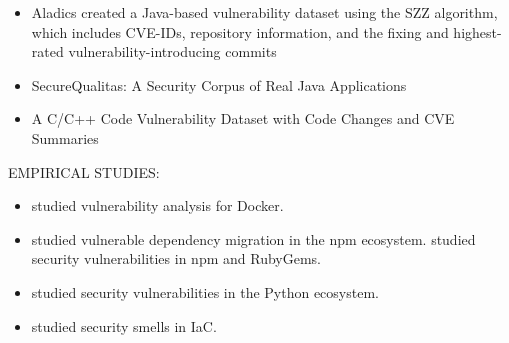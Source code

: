 \begin{itemize}
    \item Aladics \etal \cite{Aladics2022} created a Java-based vulnerability dataset using the SZZ algorithm, which includes CVE-IDs, repository information, and the fixing and highest-rated vulnerability-introducing commits

    \item {SecureQualitas}: A Security Corpus of Real {Java} Applications \cite{Benabidallah2019SecureQualitas}

    \item A {C/C++} Code Vulnerability Dataset with Code Changes and {CVE} Summaries \cite{Fan2020MSR}
\end{itemize}
EMPIRICAL STUDIES:
\begin{itemize}
    \item \cite{combe2016docker, zerouali2019impact, Zerouali2019Docker,shu2017study} studied vulnerability analysis for Docker.

    \item \cite{decan2018impact,Zapata:ICSME2018,Chinthanet:ASE2020,zimmermann2019small} studied vulnerable dependency migration in the npm ecosystem. \cite{zerouali2022impact} studied security vulnerabilities in npm and RubyGems.

    \item \cite{Alfadel2021} studied security vulnerabilities in the Python ecosystem.

    \item \cite{2019:icse:rahman,2021:tsem:rahman} studied security smells in IaC.
\end{itemize}

